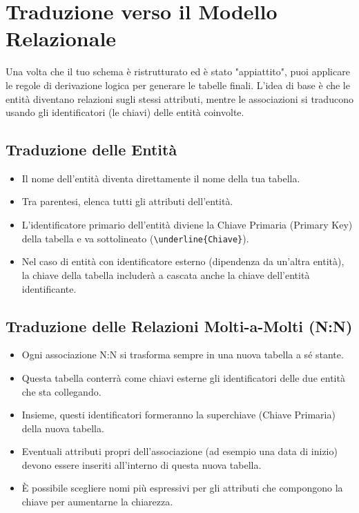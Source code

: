 \section{Traduzione verso il Modello Relazionale}
Una volta che il tuo schema è ristrutturato ed è stato "appiattito", puoi applicare le regole di derivazione logica per generare le tabelle finali. L'idea di base è che le entità diventano relazioni sugli stessi attributi, mentre le associazioni si traducono usando gli identificatori (le chiavi) delle entità coinvolte.

\subsection{Traduzione delle Entità}
\begin{itemize}
    \item Il nome dell'entità diventa direttamente il nome della tua tabella.
    \item Tra parentesi, elenca tutti gli attributi dell'entità.
    \item L'identificatore primario dell'entità diviene la Chiave Primaria (Primary Key) della tabella e va sottolineato (\verb|\underline{Chiave}|).
    \item Nel caso di entità con identificatore esterno (dipendenza da un'altra entità), la chiave della tabella includerà a cascata anche la chiave dell'entità identificante.
\end{itemize}

\subsection{Traduzione delle Relazioni Molti-a-Molti (N:N)}
\begin{itemize}
    \item Ogni associazione N:N si trasforma sempre in una nuova tabella a sé stante.
    \item Questa tabella conterrà come chiavi esterne gli identificatori delle due entità che sta collegando.
    \item Insieme, questi identificatori formeranno la superchiave (Chiave Primaria) della nuova tabella.
    \item Eventuali attributi propri dell'associazione (ad esempio una data di inizio) devono essere inseriti all'interno di questa nuova tabella.
    \item È possibile scegliere nomi più espressivi per gli attributi che compongono la chiave per aumentarne la chiarezza.
\end{itemize}

